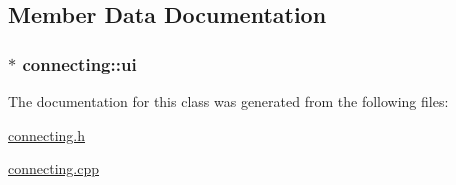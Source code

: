 \subsection{Member Data Documentation}
\hypertarget{classconnecting_a459b5a1f88bd6c43d03d6968313f8016}{
\subsubsection[{ui}]{$\ast$ connecting\-::ui\hspace{0.3cm}{\ttfamily [private]}}}\label{classconnecting_a459b5a1f88bd6c43d03d6968313f8016}


The documentation for this class was generated from the following files\-:\begin{DoxyCompactItemize}
\item 
\hyperlink{connecting_8h}{connecting.\-h}\item 
\hyperlink{connecting_8cpp}{connecting.\-cpp}\end{DoxyCompactItemize}
